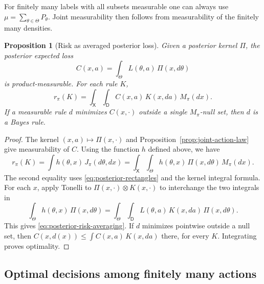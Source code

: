 \documentclass[11pt,oneside]{book}
\newtheorem{proposition}[theorem]{Proposition}
\theoremstyle{definition}
\theoremstyle{remark}
\begin{document}
For finitely many labels with all subsets measurable one can always use
$\mu=\sum_{\theta\in\Theta}P_\theta$. Joint measurability then follows
from measurability of the finitely many densities.

\begin{proposition}[Risk as averaged posterior loss]
\label{prop:posterior-risk-averaging}
Given a posterior kernel $\Pi$, the \emph{posterior expected loss}
\[
C(x,a)=\int_\Theta L(\theta,a)\,\Pi(x,d\theta)
\]
is product-measurable. For each rule $K$,
\begin{equation}
r_\pi(K)=\int_{\mathsf X}\int_{\mathsf D} C(x,a)\,K(x,da)\,M_\pi(dx).
\label{eq:posterior-risk-averaging}
\end{equation}
If a measurable rule $d$ minimizes $C(x,\cdot)$ outside a single
$M_\pi$-null set, then $d$ is a Bayes rule.
\end{proposition}
\begin{proof}
The kernel $(x,a)\mapsto\Pi(x,\cdot)$ and
Proposition~\ref{prop:joint-action-law} give measurability of $C$.
Using the function $h$ defined above, we have
\[
r_\pi(K)=\int h(\theta,x)\,J_\pi(d\theta,dx)
=\int_{\mathsf X}\int_\Theta h(\theta,x)\,\Pi(x,d\theta)\,M_\pi(dx).
\]
The second equality uses \eqref{eq:posterior-rectangles} and the
kernel integral formula. For each $x$, apply Tonelli to
$\Pi(x,\cdot)\otimes K(x,\cdot)$ to interchange the two integrals in
\[
\int_\Theta h(\theta,x)\,\Pi(x,d\theta)
=\int_\Theta\int_{\mathsf D}L(\theta,a)\,K(x,da)\,\Pi(x,d\theta).
\]
This gives \eqref{eq:posterior-risk-averaging}. If $d$ minimizes
pointwise outside a null set, then $C(x,d(x))\leq\int C(x,a)\,K(x,da)$
there, for every $K$. Integrating proves optimality.
\end{proof}

\subsection{Optimal decisions among finitely many actions}
\label{subsec:finite-bayes-actions}
\end{document}
